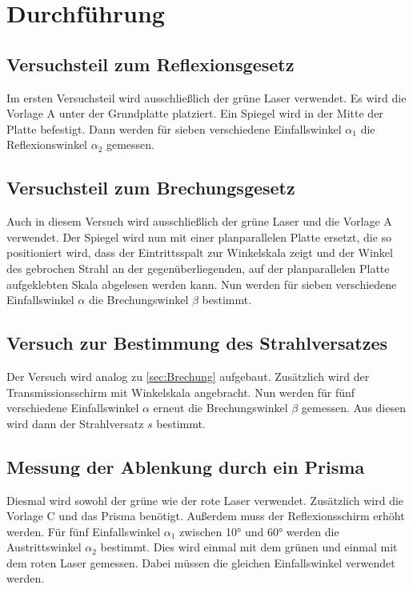 \section{Durchführung}
\label{sec:Durchführung}

\subsection{Versuchsteil zum Reflexionsgesetz}
Im ersten Versuchsteil wird ausschließlich der grüne Laser verwendet. Es wird die 
Vorlage A unter der Grundplatte platziert. Ein Spiegel wird in der Mitte der Platte befestigt.
Dann werden für sieben verschiedene Einfallswinkel $\alpha_1$ die Reflexionswinkel
$\alpha_2$ gemessen.

\subsection{Versuchsteil zum Brechungsgesetz}
\label{sec:Brechung}
Auch in diesem Versuch wird ausschließlich der grüne Laser und die Vorlage A verwendet.
Der Spiegel wird nun mit einer planparallelen Platte ersetzt, die so positioniert wird,
dass der Eintrittsspalt zur Winkelskala zeigt und der Winkel des gebrochen Strahl an der
gegenüberliegenden, auf der planparallelen Platte aufgeklebten Skala abgelesen werden
kann. Nun werden für sieben verschiedene Einfallswinkel $\alpha$ die Brechungswinkel
$\beta$ bestimmt.

\subsection{Versuch zur Bestimmung des Strahlversatzes}
Der Versuch wird analog zu \autoref{sec:Brechung} aufgebaut. Zusätzlich wird der
Transmissionsschirm mit Winkelskala angebracht. Nun werden für fünf verschiedene
Einfallswinkel $\alpha$ erneut die Brechungswinkel $\beta$ gemessen. Aus diesen wird
dann der Strahlversatz $s$ bestimmt.

\subsection{Messung der Ablenkung durch ein Prisma}
Diesmal wird sowohl der grüne wie der rote Laser verwendet. Zusätzlich wird die Vorlage C und das Prisma benötigt. 
Außerdem muss der Reflexionsschirm erhöht werden. Für fünf Einfallswinkel $\alpha_1$ zwischen 10° und 60° werden die Austrittswinkel $\alpha_2$ bestimmt. Dies wird einmal
mit dem grünen und einmal mit dem roten Laser gemessen. Dabei müssen die gleichen Einfallswinkel verwendet werden. 

